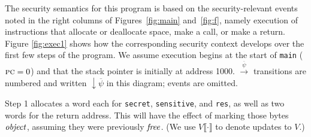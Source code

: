 \documentclass[10pt,conference]{ieeetran}%
\theoremstyle{definition}
\begin{document}
The security semantics for this program is based
on the security-relevant events noted in the right columns of Figures~\ref{fig:main}
and~\ref{fig:f}, namely execution of instructions that allocate or deallocate space,
make a call, or make a return.
Figure \ref{fig:exec1} shows how the corresponding security context
develops over the first few steps of the program. We assume execution begins
at the start of {\tt main} (\(\textsc{pc} = 0\)) and that the stack pointer is initially at
address 1000.
\(\xrightarrow{\overline{\psi}}\) transitions are numbered and
written \(\downarrow \overline{\psi}\) in this diagram; events are omitted.

Step 1 allocates a word each for {\tt secret}, {\tt sensitive}, and {\tt res}, as well
as two words for the return address. This will have the
effect of marking those bytes \(\mathit{object}\), assuming they were previously
\(\mathit{free}\). (We use \(V\llbracket\cdot\rrbracket\) to denote updates to \(V\).)
%

\newcommand{\freebox}{\tikz \filldraw[fill=blue] (0,0) rectangle (10px,10px);}
\newcommand{\pubbox}{\tikz \filldraw[fill=lightgray] (0,0) rectangle (10px,10px);}
\newcommand{\objbox}{\tikz \filldraw[fill=yellow] (0,0) rectangle (10px,10px);}
\newcommand{\sealbox}{\tikz \filldraw[fill=red] (0,0) rectangle (10px,10px);}
\end{document}
